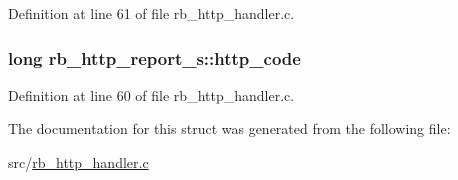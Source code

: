 Definition at line 61 of file rb\-\_\-http\-\_\-handler.\-c.

\hypertarget{structrb__http__report__s_a44a22dfbde3f5d2c5eafba73f5be2afa}{
\subsubsection[{http\-\_\-code}]{\setlength{\rightskip}{0pt plus 5cm}long rb\-\_\-http\-\_\-report\-\_\-s\-::http\-\_\-code}}\label{structrb__http__report__s_a44a22dfbde3f5d2c5eafba73f5be2afa}


Definition at line 60 of file rb\-\_\-http\-\_\-handler.\-c.



The documentation for this struct was generated from the following file\-:\begin{DoxyCompactItemize}
\item 
src/\hyperlink{rb__http__handler_8c}{rb\-\_\-http\-\_\-handler.\-c}\end{DoxyCompactItemize}
